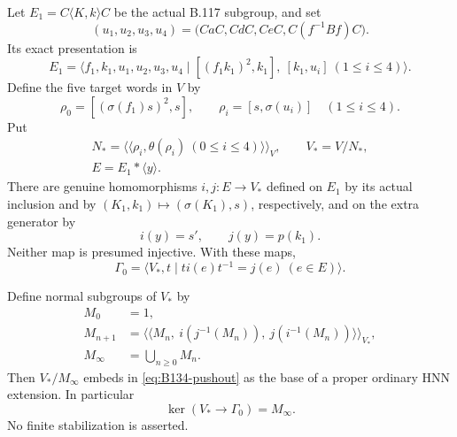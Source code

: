 Let $E_1=C\langle K,k\rangle C$ be the actual B.117 subgroup,
and set
\[
 (u_1,u_2,u_3,u_4)
   =\bigl(CaC,CdC,CeC,C(f^{-1}Bf)C\bigr).
\]
Its exact presentation is
\begin{equation}\label{eq:B134-E1}
 E_1=\langle f_1,k_1,u_1,u_2,u_3,u_4\mid
      [(f_1k_1)^2,k_1],\ [k_1,u_i]\ (1\leq i\leq4)\rangle.
\end{equation}
Define the five target words in $V$ by
\begin{equation}\label{eq:B134-rhos}
 \rho_0=[(\sigma(f_1)s)^2,s],\qquad
 \rho_i=[s,\sigma(u_i)]\quad(1\leq i\leq4).
\end{equation}
Put
\begin{equation}\label{eq:B134-initial-quotient}
 \begin{gathered}
 N_* =\langle\!\langle\rho_i,\theta(\rho_i)
                         \ (0\leq i\leq4)\rangle\!\rangle_V,
 \qquad V_*=V/N_*,\\
 E=E_1*\langle y\rangle.
 \end{gathered}
\end{equation}
There are genuine homomorphisms $i,j:E\to V_*$ defined on
$E_1$ by its actual inclusion and by $(K_1,k_1)\mapsto
(\sigma(K_1),s)$, respectively, and on the extra generator by
\begin{equation}\label{eq:B134-extra-edge}
 i(y)=s',\qquad j(y)=p(k_1).
\end{equation}
Neither map is presumed injective. With these maps,
\begin{equation}\label{eq:B134-pushout}
 \Gamma_0=\langle V_*,t\mid ti(e)t^{-1}=j(e)\ (e\in E)\rangle.
\end{equation}

Define normal subgroups of $V_*$ by
\begin{equation}\label{eq:B134-saturation}
 \begin{split}
 M_0&=1,\\
 M_{n+1}&=\langle\!\langle M_n,\ i(j^{-1}(M_n)),\
                            j(i^{-1}(M_n))\rangle\!\rangle_{V_*},\\
 M_\infty&=\bigcup_{n\geq0}M_n.
 \end{split}
\end{equation}
Then $V_*/M_\infty$ embeds in \eqref{eq:B134-pushout} as the
base of a proper ordinary HNN extension. In particular
\begin{equation}\label{eq:B134-discrete-base-kernel}
 \ker(V_*\longrightarrow\Gamma_0)=M_\infty.
\end{equation}
No finite stabilization is asserted.

